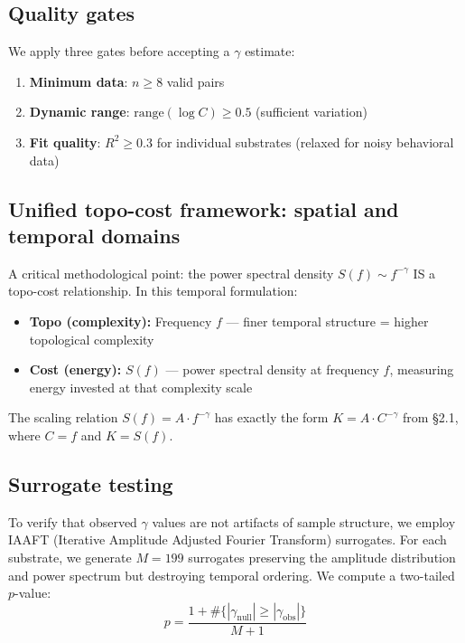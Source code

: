 \documentclass[11pt,a4paper,twocolumn]{article}
\begin{document}
\subsection{Quality gates}

We apply three gates before accepting a $\gamma$ estimate:
\begin{enumerate}
\item \textbf{Minimum data}: $n \geq 8$ valid pairs
\item \textbf{Dynamic range}: $\text{range}(\log C) \geq 0.5$ (sufficient variation)
\item \textbf{Fit quality}: $R^2 \geq 0.3$ for individual substrates (relaxed for noisy behavioral data)
\end{enumerate}

\subsection{Unified topo-cost framework: spatial and temporal domains}

A critical methodological point: the power spectral density $S(f) \sim f^{-\gamma}$ IS a topo-cost relationship. In this temporal formulation:
\begin{itemize}
\item \textbf{Topo (complexity):} Frequency $f$ --- finer temporal structure = higher topological complexity
\item \textbf{Cost (energy):} $S(f)$ --- power spectral density at frequency $f$, measuring energy invested at that complexity scale
\end{itemize}

The scaling relation $S(f) = A \cdot f^{-\gamma}$ has exactly the form $K = A \cdot C^{-\gamma}$ from \S2.1, where $C = f$ and $K = S(f)$.

\subsection{Surrogate testing}

To verify that observed $\gamma$ values are not artifacts of sample structure, we employ IAAFT (Iterative Amplitude Adjusted Fourier Transform) surrogates. For each substrate, we generate $M = 199$ surrogates preserving the amplitude distribution and power spectrum but destroying temporal ordering. We compute a two-tailed $p$-value:
\begin{equation}
p = \frac{1 + \#\{|\gamma_{\text{null}}| \geq |\gamma_{\text{obs}}|\}}{M + 1}
\end{equation}
\end{document}
